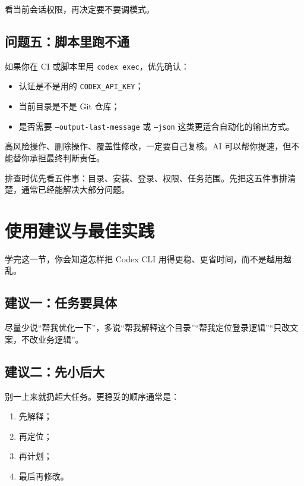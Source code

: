\documentclass[UTF8,a4paper,12pt]{ctexart}
\begin{document}
看当前会话权限，再决定要不要调模式。

\subsection{问题五：脚本里跑不通}

如果你在 CI 或脚本里用 \texttt{codex exec}，优先确认：
\begin{itemize}
  \item 认证是不是用的 \texttt{CODEX\_API\_KEY}；
  \item 当前目录是不是 Git 仓库；
  \item 是否需要 \texttt{--output-last-message} 或 \texttt{--json} 这类更适合自动化的输出方式。
\end{itemize}

\begin{warnbox}
高风险操作、删除操作、覆盖性修改，一定要自己复核。AI 可以帮你提速，但不能替你承担最终判断责任。
\end{warnbox}

\begin{sumbox}
排查时优先看五件事：目录、安装、登录、权限、任务范围。先把这五件事排清楚，通常已经能解决大部分问题。
\end{sumbox}

\section{使用建议与最佳实践}

\begin{learnbox}
学完这一节，你会知道怎样把 Codex CLI 用得更稳、更省时间，而不是越用越乱。
\end{learnbox}

\subsection{建议一：任务要具体}

尽量少说“帮我优化一下”，多说“帮我解释这个目录”“帮我定位登录逻辑”“只改文案，不改业务逻辑”。

\subsection{建议二：先小后大}

别一上来就扔超大任务。更稳妥的顺序通常是：
\begin{enumerate}
  \item 先解释；
  \item 再定位；
  \item 再计划；
  \item 最后再修改。
\end{enumerate}
\end{document}
